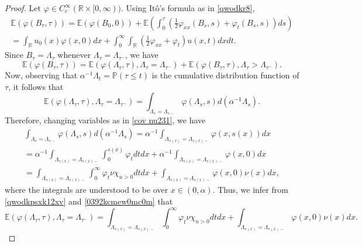 \documentclass{article}
\numberwithin{equation}{section}
\numberwithin{figure}{section}
\theoremstyle{plain}
\theoremstyle{plain}
\theoremstyle{plain}
\theoremstyle{plain}
\theoremstyle{definition}
\theoremstyle{remark}
\def\R{{\mathbb{R}}}
\def\E{{\mathbb{E}}}
\def\P{{\mathbb{P}}}
\begin{document}
\begin{proof} Let $\varphi\in C_c^{\infty}(\R \times [0,\infty))$. Using It\^o's formula as in \eqref{qwodkr8},
\begin{multline}\label{qwodkr8u392qwxk12xv}
    \E(\varphi(B_{\tau},\tau))= \E(\varphi(B_0,0))+\E\left( \int_{0}^\tau \left(\frac{1}{2}\varphi_{xx}(B_s,s)+\varphi_t(B_s,s)\right)ds\right)
    \\=\int_{\R}u_0(x)\varphi(x,0)dx+ \int_{0}^{\infty}\int_{\R} \left( \frac{1}{2}\varphi_{xx}+\varphi_t\right)u(x,t)dxdt.\end{multline}
    Since $B_{\tau}=\Lambda_{\tau}$ whenever $\Lambda_{\tau}=\Lambda_{\tau^-}$, we have
\begin{equation}  \label{expcqwsum02s}\E(\varphi(B_{\tau},\tau))=\E(\varphi(\Lambda_{\tau},\tau), \Lambda_{\tau}=\Lambda_{\tau^-})+\E(\varphi(B_{\tau},\tau),\Lambda_{\tau}>\Lambda_{\tau^-}).\end{equation}
Now, observing that $\alpha^{-1}\Lambda_t=\P(\tau \leq t)$ is the cumulative distribution function of $\tau$, it follows that
    \begin{equation} \label{qwodkpsxk12xv}
        \E(\varphi(\Lambda_{\tau},\tau), \Lambda_{\tau}=\Lambda_{\tau^-})=\int_{\Lambda_s=\Lambda_{s-}}\varphi(\Lambda_s,s)d(\alpha^{-1}\Lambda_s).
    \end{equation}
Therefore, changing variables as in \eqref{cov nu231}, we have
     \begin{multline} \label{0392kcmew0mc0m}
         \int_{\Lambda_s=\Lambda_{s-}}\varphi(\Lambda_s,s)d(\alpha^{-1}\Lambda_s)
         =\alpha^{-1}\int_{{\Lambda_{s(x)}=\Lambda_{s(x)-}}}\varphi( x,s(x))dx\\=\alpha^{-1}\int_{\Lambda_{s(x)}=\Lambda_{s(x)-}}\int_{0}^{s(x)}\varphi_tdtdx+\alpha^{-1}\int_{\Lambda_{s(x)}=\Lambda_{s(x)-}}\varphi(x,0)dx\\=\int_{\Lambda_{s(x)}=\Lambda_{s(x)-}}\int_{0}^{\infty}\varphi_t\nu\chi_{u>0}dtdx+\int_{\Lambda_{s(x)}=\Lambda_{s(x)-}}\varphi(x,0)\nu(x)dx,
     \end{multline}
where the integrals are understood to be over $x\in (0,\alpha)$. Thus, we infer from \eqref{qwodkpsxk12xv} and \eqref{0392kcmew0mc0m} that
\begin{equation} \label{epx1dwlpas}
    \E(\varphi(\Lambda_{\tau},\tau), \Lambda_{\tau}=\Lambda_{\tau^-})=\int_{\Lambda_{s(x)}=\Lambda_{s(x)-}}\int_{0}^{\infty}\varphi_t\nu\chi_{u>0}dtdx+\int_{\Lambda_{s(x)}=\Lambda_{s(x)-}}\varphi(x,0)\nu(x)dx.
\end{equation}

\end{proof}
\end{document}
